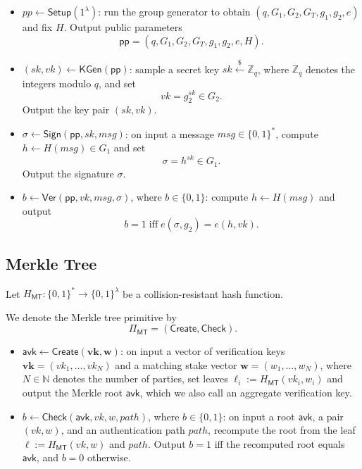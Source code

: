 \documentclass{article}
\begin{document}
\begin{itemize}
  \item $pp \leftarrow \mathsf{Setup}(1^\lambda)$:  
        run the group generator to obtain
        $(q, G_1, G_2, G_T, g_1, g_2, e)$ and fix $H$.
        Output public parameters
        \[
          \mathsf{pp} = (q, G_1, G_2, G_T, g_1, g_2, e, H).
        \]

  \item $(sk,vk) \leftarrow \mathsf{KGen}(\mathsf{pp})$:  
        sample a secret key $sk \xleftarrow{\$} \mathbb{Z}_q$, where
        $\mathbb{Z}_q$ denotes the integers modulo $q$, and set
        \[
          vk = g_2^{sk} \in G_2.
        \]
        Output the key pair $(sk, vk)$.

  \item $\sigma \leftarrow \mathsf{Sign}(\mathsf{pp}, sk, msg)$:  
        on input a message $msg \in \{0,1\}^*$, compute
        $h \leftarrow H(msg) \in G_1$ and set
        \[
          \sigma = h^{sk} \in G_1.
        \]
        Output the signature $\sigma$.

  \item $b \leftarrow \mathsf{Ver}(\mathsf{pp}, vk, msg, \sigma)$, where $b \in \{0,1\}$:  
        compute $h \leftarrow H(msg)$ and output
        \[
          b = 1
          \;\text{iff}\;
          e(\sigma, g_2) = e(h, vk).
        \]
\end{itemize}

\subsection{Merkle Tree}

Let $H_{\mathsf{MT}}  : \{0,1\}^* \to \{0,1\}^\lambda$ be a collision-resistant hash function.

We denote the Merkle tree primitive by
\[
  \Pi_{\mathsf{MT}} = (\mathsf{Create}, \mathsf{Check}).
\]

\begin{itemize}

  \item $\mathsf{avk} \leftarrow \mathsf{Create}(\mathbf{vk}, \mathbf{w})$:
        on input a vector of verification keys
        $\mathbf{vk} = (vk_1,\dots,vk_N)$ and a matching stake vector
        $\mathbf{w}=(w_1,\dots,w_N)$, where $N \in \mathbb{N}$ denotes
        the number of parties, set leaves
        $\ell_i := H_{\mathsf{MT}}(vk_i , w_i)$ and output the Merkle root
        $\mathsf{avk}$, which we also call an aggregate verification key.

  \item $b \leftarrow \mathsf{Check}(\mathsf{avk}, vk, w, path)$, where $b \in \{0,1\}$:
        on input a root $\mathsf{avk}$, a pair $(vk,w)$, and an authentication
        path $path$, recompute the root from the leaf
        $\ell := H_{\mathsf{MT}}(vk , w)$ and $path$. Output $b = 1$ iff the
        recomputed root equals $\mathsf{avk}$, and $b = 0$ otherwise.

\end{itemize}
\end{document}
